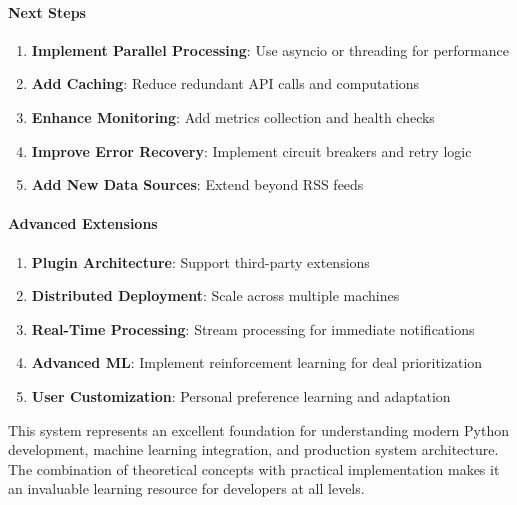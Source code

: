 \paragraph{Next Steps \starfull\starfull\starfull\starfull\starempty}
\begin{enumerate}
\item \textbf{Implement Parallel Processing}: Use asyncio or threading for performance
\item \textbf{Add Caching}: Reduce redundant API calls and computations
\item \textbf{Enhance Monitoring}: Add metrics collection and health checks
\item \textbf{Improve Error Recovery}: Implement circuit breakers and retry logic
\item \textbf{Add New Data Sources}: Extend beyond RSS feeds
\end{enumerate}

\paragraph{Advanced Extensions \starfull\starfull\starfull\starempty\starempty}
\begin{enumerate}
\item \textbf{Plugin Architecture}: Support third-party extensions
\item \textbf{Distributed Deployment}: Scale across multiple machines
\item \textbf{Real-Time Processing}: Stream processing for immediate notifications
\item \textbf{Advanced ML}: Implement reinforcement learning for deal prioritization
\item \textbf{User Customization}: Personal preference learning and adaptation
\end{enumerate}

This system represents an excellent foundation for understanding modern Python development, machine learning integration, and production system architecture. The combination of theoretical concepts with practical implementation makes it an invaluable learning resource for developers at all levels.
